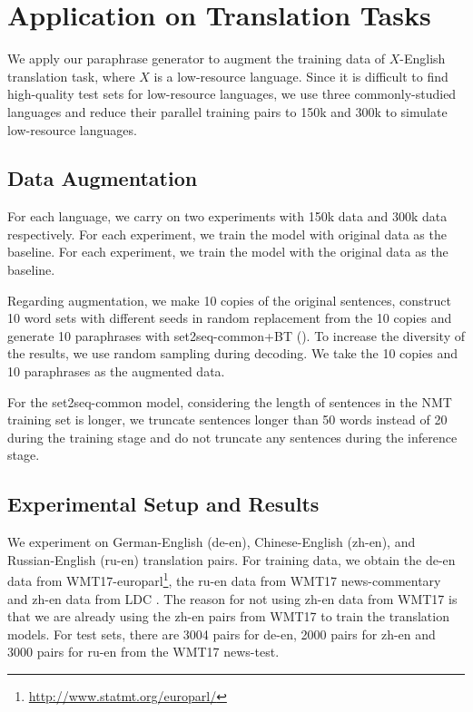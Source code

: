 \section{Application on Translation Tasks} \label{sec:app}
We apply our paraphrase generator to augment the training data of $X$-English 
translation task, where $X$ is a low-resource language. 
Since it is difficult to find high-quality test sets for low-resource 
languages, we use three commonly-studied languages and reduce their 
parallel training pairs to 150k and 300k to simulate low-resource languages. 

\subsection{Data Augmentation}

For each language, we carry on two experiments with 150k data and 300k data respectively. For each experiment, we train the model with original data 
as the baseline. 
For each experiment, we train the model with the original
data as the baseline.

Regarding augmentation, we make 10 copies of the original sentences, 
construct 10 word sets with different seeds in random replacement from the 10 copies and generate 10 paraphrases 
with set2seq-common+BT (). To increase the diversity of the results, 
we use random sampling \citep{edunov2018understanding} during decoding. 
We take the 10 copies and 10 paraphrases as the augmented data.

For the set2seq-common model, considering the length of sentences 
in the NMT training set is longer, we truncate sentences longer 
than 50 words instead of 20 during the training stage and 
do not truncate any sentences during the inference stage.

\subsection{Experimental Setup and Results}
We experiment on German-English (de-en), Chinese-English (zh-en), and Russian-English (ru-en) translation pairs. For training data, we obtain the de-en data from WMT17-europarl\footnote{\url{http://www.statmt.org/europarl/}}\citep{koehn2005europarl}, the ru-en data from WMT17 news-commentary and zh-en data from LDC \citep{liberman2002emotional,huang2002multiple}. The reason for not using zh-en data from WMT17 is that we are already using the zh-en pairs from WMT17 to train 
the translation models.
For test sets, there are 3004 pairs for de-en, 2000 pairs for zh-en and 
3000 pairs for ru-en from the WMT17 news-test.


